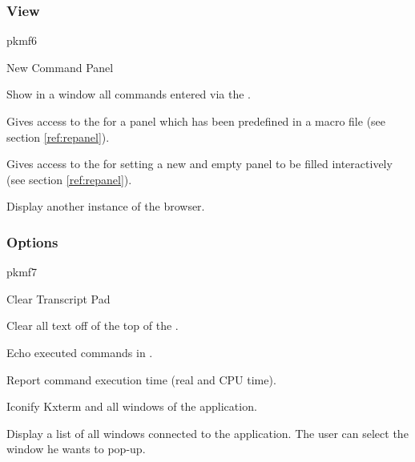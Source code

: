 \subsubsection*{View}
\label{ref:repkmf6}
\begin{PICTf}{pkmf6}
\begin{DLsf}{New Command Panel}
\item[Show Input]
         Show in a window all commands entered via the \INP{}.
\item[Command Panel]
         Gives access to the \KUIPMotif{} \PNI{}
         for a panel which has been predefined in a \KUIP{} macro file 
         (see section \ref{ref:repanel}).
\item[New Command Panel]
         Gives access to the \KUIPMotif{} \PNI{}
         for setting a new and empty panel to be filled interactively
         (see section \ref{ref:repanel}).
\item[Browser]
          Display another instance of the browser.
\end{DLsf}
\end{PICTf}

\subsubsection*{Options}
\begin{PICTf}{pkmf7}
\begin{DLsf}{Clear Transcript Pad}
\item[Clear Transcript Pad]
         Clear all text off of the top of the \TP{}.
\item[Echo Command]
         Echo executed commands in \TP{}.
\item[Timing]
         Report command execution time (real and CPU time).
\item[Iconify]
         Iconify Kxterm and all windows of the application.
\item[Raise Window]
         Display a list of all windows connected to the application. 
         The user can select the window he wants to pop-up. 
\end{DLsf}
\end{PICTf}

